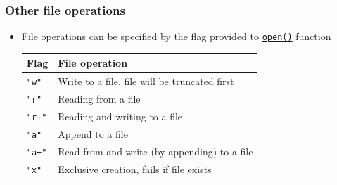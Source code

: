 \documentclass[xcolor=table]{beamer}
\begin{document}
\begin{frame}[fragile]
    \frametitle{Other file operations}
\begin{itemize}
    \item File operations can be specified by the flag provided to \href{https://docs.python.org/3/library/functions.html#open}{\texttt{open()}} function \pause 
\begin{center}
    \begin{tabular}{|l|l|}\hline
        Flag & File operation \\ \hline
        \texttt{"w"}
    & Write to a file, file will be truncated first \\
        \texttt{"r"} & Reading from a file \\
        \texttt{"r+"} & Reading and writing to a file \\
        \texttt{"a"} & Append to a file \\
        \texttt{"a+"} & Read from and write (by appending) to a file \\
        \texttt{"x"} & Exclusive creation, fails if file exists \\ \hline
    \end{tabular}
\end{center}
\end{itemize}
\end{frame}
\end{document}
